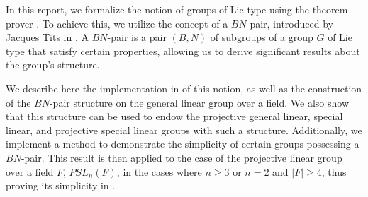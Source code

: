 In this report, we formalize the notion of groups of Lie type using the theorem prover \Lean. To achieve this, we utilize the concept of a $BN$-pair, introduced by Jacques Tits in \cite{tits_algebraic_1964}. A $BN$-pair is a pair $\left(B, N\right)$ of subgroups of a group $G$ of Lie type that satisfy certain properties, allowing us to derive significant results about the group's structure.

We describe here the implementation in \Lean of this notion, as well as the construction of the $BN$-pair structure on the general linear group over a field. We also show that this structure can be used to endow the projective general linear, special linear, and projective special linear groups with such a structure. Additionally, we implement a method to demonstrate the simplicity of certain groups possessing a $BN$-pair. This result is then applied to the case of the projective linear group over a field $F$, $PSL_n(F)$, in the cases where $n \geq 3$ or $n = 2$ and $|F| \geq 4$, thus proving its simplicity in \Lean.



  









